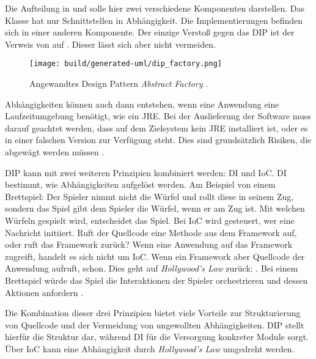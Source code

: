 Die Aufteilung in  und  solle hier zwei verschiedene Komponenten darstellen. Das Klasse  hat nur Schnittstellen in Abhängigkeit. Die Implementierungen befinden sich in einer anderen Komponente. Der einzige Verstoß gegen das \ac{DIP} ist der Verweis von  auf . Dieser lässt sich aber nicht vermeiden.

\begin{figure}
  \centering
  \texttt{[image: build/generated-uml/dip\_factory.png]}
   \caption{Angewandtes Design Pattern \textit{Abstract Factory} \citep[vgl.][90]{martin2018}.}
   \label{fig:dip_factory}
\end{figure}

Abhängigkeiten können auch dann entstehen, wenn eine Anwendung \bspw eine Laufzeitumgebung benötigt, wie \zb ein \ac{JRE}. Bei der Auslieferung der Software muss darauf geachtet werden, dass auf dem Zielsystem \ggf kein \ac{JRE} installiert ist, oder es in einer falschen Version zur Verfügung steht. Dies sind grundsätzlich Risiken, die abgewägt werden müssen \citep[vgl.][]{schuchert2013}. 

\ac{DIP} kann mit zwei weiteren Prinzipien kombiniert werden: \ac{DI} und \ac{IoC}. \ac{DI} bestimmt, wie Abhängigkeiten aufgelöst werden. Am Beispiel von einem Brettspiel: Der Spieler nimmt nicht die Würfel und rollt diese in seinem Zug, sondern das Spiel gibt dem Spieler die Würfel, wenn er am Zug ist. Mit welchen Würfeln gespielt wird, entscheidet das Spiel. Bei \ac{IoC} wird gesteuert, wer eine Nachricht initiiert. Ruft der Quellcode eine Methode aus dem Framework auf, oder ruft das Framework zurück? Wenn eine Anwendung auf das Framework zugreift, handelt es sich nicht um \ac{IoC}. Wenn ein Framework aber Quellcode der Anwendung aufruft, schon. Dies geht auf \textit{Hollywood's Law} zurück: . Bei einem Brettspiel würde das Spiel die Interaktionen der Spieler orchestrieren und dessen Aktionen anfordern \citep[vgl.][]{schuchert2013}.

Die Kombination dieser drei Prinzipien bietet viele Vorteile zur Strukturierung von Quellcode und der Vermeidung von ungewollten Abhängigkeiten. \ac{DIP} stellt hierfür die Struktur dar, während \ac{DI} für die Versorgung konkreter Module sorgt. Über \ac{IoC} kann eine Abhängigkeit durch \textit{Hollywood's Law} umgedreht werden.


